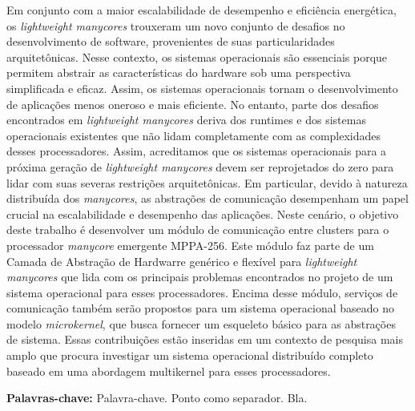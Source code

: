 
\begin{resumo}[Resumo]
    Em conjunto com a maior escalabilidade de desempenho e eficiência energética,
    os \textit{lightweight manycores} trouxeram um novo conjunto de desafios no
    desenvolvimento de software, provenientes de suas particularidades arquitetônicas.
    Nesse contexto, os sistemas operacionais são essenciais porque permitem abstrair
    as características do hardware sob uma perspectiva simplificada e eficaz.
    Assim, os sistemas operacionais tornam o desenvolvimento de aplicações
    menos oneroso e mais eficiente.
    No entanto, parte dos desafios encontrados em \textit{lightweight manycores}
    deriva dos runtimes e dos sistemas operacionais existentes que não lidam
    completamente com as complexidades desses processadores.
    Assim, acreditamos que os sistemas operacionais para a próxima geração de
    \textit{lightweight manycores} devem ser reprojetados do zero para lidar
    com suas severas restrições arquitetônicas.
    Em particular, devido à natureza distribuída dos \textit{manycores}, as
    abstrações de comunicação desempenham um papel crucial na escalabilidade
    e desempenho das aplicações.
    Neste cenário, o objetivo deste trabalho é desenvolver um módulo de comunicação
    entre clusters para o processador \textit{manycore} emergente MPPA-256.
    Este módulo faz parte de um Camada de Abstração de Hardwarre genérico e
    flexível para \textit{lightweight manycores} que lida com os principais
    problemas encontrados no projeto de um sistema operacional para esses processadores.
    Encima desse módulo, serviços de comunicação também serão propostos para
    um sistema operacional baseado no modelo \textit{microkernel}, que busca
    fornecer um esqueleto básico para as abstrações de sistema.
    Essas contribuições estão inseridas em um contexto de pesquisa mais amplo
    que procura investigar um sistema operacional distribuído completo baseado
    em uma abordagem multikernel para esses processadores.

    \vspace{\baselineskip} 
    \textbf{Palavras-chave:} Palavra-chave. Ponto como separador. Bla.
\end{resumo}


